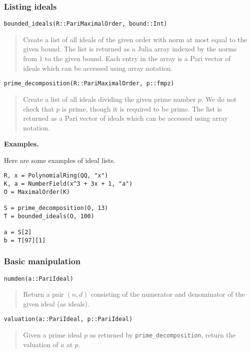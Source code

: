 \documentclass[a4paper,10pt]{article}
\newcommand{\code}{\lstinline}
\newcommand{\desc}[1]{\vspace{-3mm}\begin{quote}#1\end{quote}}
\begin{document}
{{\subsubsection{Listing ideals}

\begin{lstlisting}
bounded_ideals(R::PariMaximalOrder, bound::Int)
\end{lstlisting}

\desc{Create a list of all ideals of the given order with norm at most equal to the
given bound. The list is returned as a Julia array indexed by the norms from $1$ to
the given bound. Each entry in the array is a Pari vector of ideals which can be
accessed using array notation.}

\begin{lstlisting}
prime_decomposition(R::PariMaximalOrder, p::fmpz)
\end{lstlisting}

\desc{Create a list of all ideals dividing the given prime number $p$. We do not
check that $p$ is prime, though it is required to be prime. The list is returned
as a Pari vector of ideals which can be accessed using array notation.}

\textbf{Examples.}

Here are some examples of ideal lists.

\begin{lstlisting}
R, x = PolynomialRing(QQ, "x")
K, a = NumberField(x^3 + 3x + 1, "a")
O = MaximalOrder(K)

S = prime_decomposition(O, 13)
T = bounded_ideals(O, 100)

a = S[2]
b = T[97][1]
\end{lstlisting}

\subsubsection{Basic manipulation}

\begin{lstlisting}
numden(a::PariIdeal)
\end{lstlisting}

\desc{Return a pair $(n, d)$ consisting of the numerator and denominator
of the given ideal (as ideals).}

\begin{lstlisting}
valuation(a::PariIdeal, p::PariIdeal)
\end{lstlisting}

\desc{Given a prime ideal $p$ as returned by \code{prime_decomposition}, return
the valuation of $a$ at $p$.}

}}
\end{document}
